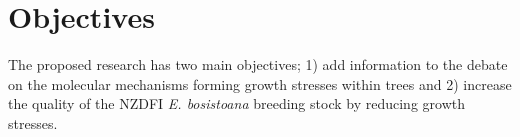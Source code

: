 \section{Objectives}
The proposed research has two main objectives; 1) add information to the
debate on the molecular mechanisms forming growth stresses within trees and 2)
increase the quality of the NZDFI \textit{E.
bosistoana} breeding stock by reducing growth stresses.